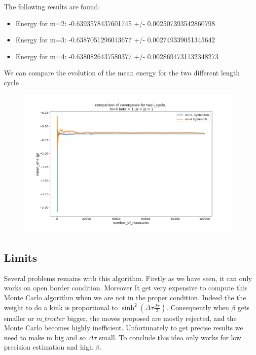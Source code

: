 \documentclass[a4paper,12pt]{article}
\begin{document}
	
	The following results are found:
	\begin{itemize}[label=$\star$]
	\item Energy for m=2: -0.6393578437601745 +/- 0.002507393542860798
	\item Energy for m=3: -0.6387051296013677 +/- 0.002749339051345642
	\item Energy for m=4: -0.6380826437580377 +/- 0.0028694731132348273
	\end{itemize}
	 We  can compare the evolution of the mean energy for the two different length cycle
		 	\begin{figure}[H]
		 	\centering
		 	
		 	\includegraphics[scale=0.4]{lcyclecomp.png}
		 	
		 	
	 \end{figure}



	
	\subsection{Limits}
	Several problems remains with this algorithm. Firstly as we have seen, it can only works on open border condition.
	Moreover It get very expensive to compute this Monte Carlo algorithm when we are not in the proper condition. Indeed the the weight to do a kink is proportional to $\sinh^2(\Delta\tau \frac{Jx}{2})$. Consequently when $\beta$ gets smaller or $m\_trotter$ bigger, the moves proposed are mostly rejected, and the Monte Carlo becomes highly inefficient. Unfortunately to get precise results we need to make m big and so $\Delta\tau$ small. 
	To conclude this idea only works for low precision estimation and high $\beta$.
	
\end{document}
